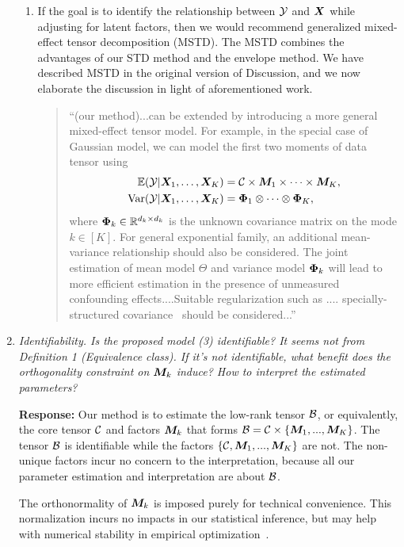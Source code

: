 \documentclass[11pt]{article}
\theoremstyle{plain}
\theoremstyle{definition}
\begin{document}
\begin{enumerate}[wide, labelwidth=!, labelindent=0pt]
\begin{enumerate}
    \item If the goal is to identify the relationship between $\mathcal{Y}$ and $\bm X$ while adjusting for latent factors, then we would recommend generalized mixed-effect tensor decomposition (MSTD). The MSTD combines the advantages of our STD method and the envelope method. We have described MSTD in the original version of Discussion, and we now elaborate the discussion in light of aforementioned work. 
    
    
    \begin{quote}
    ``(our method)...can be extended by introducing a more general mixed-effect tensor model. For example, in the special case of Gaussian model, we can model the first two moments of data tensor using
\begin{align}\label{eq:extention}
\mathbb{E}(\mathcal{Y}|\bm X_1,\ldots,\bm X_K)&=\mathcal{C}\times\bm M_1\times \cdots \times \bm M_K,\\
 \text{Var}(\mathcal{Y}|\bm X_1,\ldots,\bm X_K)&=\bm{\Phi}_1\otimes \cdots \otimes \bm{\Phi}_K,
\end{align}
where $\bm{\Phi}_k\in\mathbb{R}^{d_k\times d_k}$ is the unknown covariance matrix on the mode $k\in[K]$. For general exponential family, an additional mean-variance relationship should also be considered. The joint estimation of mean model $\Theta$ and variance model $\bm{\Phi}_k$ will lead to more efficient estimation in the presence of unmeasured confounding effects....Suitable regularization such as .... specially-structured covariance~\citep{li2017parsimonious,lock2018supervised} should be considered...''
    \end{quote}
\end{enumerate}

    
     \item \textit{Identifiability. Is the proposed model (3) identifiable? It seems not from Definition 1 (Equivalence class). If it’s not identifiable, what benefit does the orthogonality constraint on $\bm M_k$ induce? How to interpret the estimated parameters? } 
     
     \textbf{Response:} Our method is to estimate the low-rank tensor $\mathcal{B}$, or equivalently, the core tensor $\mathcal{C}$ and factors $\bm M_k$ that forms $\mathcal{B} = \mathcal{C} \times \{ \bm M_1,...,\bm M_K \}$. The tensor $\mathcal{B}$ is identifiable while the factors $\{\mathcal{C}, \bm M_1,...,\bm M_K \}$ are not. The non-unique factors incur no concern to the interpretation, because all our parameter estimation and interpretation are about $\mathcal{B}$.  
     
     The orthonormality of $\bm M_k$ is imposed purely for technical convenience. This normalization incurs no impacts in our statistical inference, but may help with numerical stability in empirical optimization~\citep{de2000multilinear, kolda2009tensor}.
    

\end{enumerate}
\end{document}
